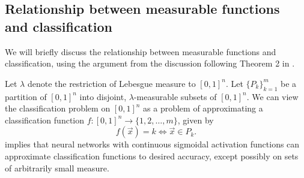 \subsection{Relationship between measurable functions and classification}
\label{subsection:universality:measure:relationship}
We will briefly discuss the relationship between measurable functions and classification, using the argument from the discussion following Theorem 2 in \cite{cybenko_1989_approximation}.

Let $\lambda$ denote the restriction of Lebesgue measure to $[0,1]^n$. Let $\{ P_k \}_{k=1}^m$ be a partition of $[0,1]^n$ into disjoint, $\lambda$-measurable subsets of $[0,1]^n$. We can view the classification problem on $[0,1]^n$ as a problem of approximating a classification function $f : [0,1]^n \to \{ 1, 2, \ldots, m \}$, given by \[ 
    f (\vec{x}) = k \iff \vec{x} \in P_k.
\]
 implies that neural networks with continuous sigmoidal activation functions can approximate classification functions to desired accuracy, except possibly on sets of arbitrarily small measure.